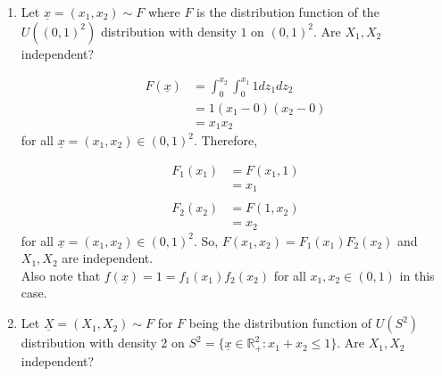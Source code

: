 \documentclass{article}
\newcommand{\R}{\mathbb{R}}
\begin{document}
	\begin{myex}{}{}
		\begin{enumerate}
			\item Let $\underline{x}=(x_1, x_2)\sim F$ where $F$ is the distribution function of the $U((0, 1)^2)$ distribution with density $1$ on $(0, 1)^2$. Are $X_1, X_2$ independent?
			
				\begin{align*}
					F(\underline{x})&=\int_{0}^{x_2}\int_{0}^{x_1}1dz_1dz_2\\
					&=1(x_1-0)(x_2-0)\\
					&=x_1x_2
				\end{align*}
				for all $\underline{x}=(x_1, x_2)\in(0, 1)^2$. Therefore,
				
				\begin{align*}
					F_1(x_1)&=F(x_1, 1)\\
					&=x_1\\\\
					F_2(x_2)&=F(1, x_2)\\
					&=x_2
				\end{align*}
				for all $\underline{x}=(x_1, x_2)\in(0, 1)^2$. So, $F(x_1, x_2)=F_1(x_1)F_2(x_2)$ and $X_1, X_2$ are independent.\\
				
				Also note that $f(\underline{x})=1=f_1(x_1)f_2(x_2)$ for all $x_1, x_2\in(0, 1)$ in this case.
				
			\item Let $\underline{X}=(X_1, X_2)\sim F$ for $F$ being the distribution function of $U(S^2)$ distribution with density 2 on $S^2=\{\underline{x}\in\R^2_+ : x_1+x_2\leq1\}$. Are $X_1, X_2$ independent?
				

\end{enumerate}
\end{myex}
\end{document}
